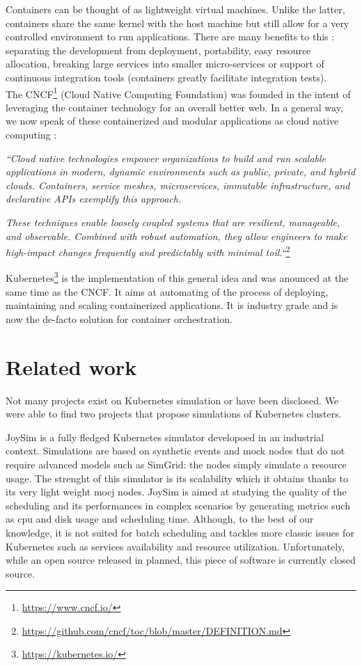 Containers can be thought of as lightweight virtual machines. Unlike the
latter, containers share the same kernel with the host machine but still allow
for a very controlled environment to run applications. There are many
benefits to this : separating the development from deployment, portability,
easy resource allocation, breaking large services into smaller micro-services
or support of continuous integration tools (containers greatly facilitate
integration tests).\\

The CNCF\footnote{\url{https://www.cncf.io/}} (Cloud Native Computing
Foundation) was founded in the intent of leveraging the container technology
for an overall better web. In a general way, we now speak of these
containerized and modular applications as cloud native computing :

\textit{``Cloud native technologies empower organizations to build and run
	scalable applications in modern, dynamic environments such as public,
	private, and hybrid clouds. Containers, service meshes, microservices,
	immutable infrastructure, and declarative APIs exemplify this
	approach.}

\textit{These techniques enable loosely coupled systems that
	are resilient, manageable, and observable.  Combined with robust
	automation, they allow engineers to make high-impact changes frequently
	and predictably with minimal toil.``}\footnote{\url{https://github.com/cncf/toc/blob/master/DEFINITION.md}}

Kubernetes\footnote{\url{https://kubernetes.io/}} is the implementation of this
general idea and was anounced at the same time as the CNCF. It aims at
automating of the process of deploying, maintaining and scaling containerized
applications. It is industry grade and is now the de-facto solution for
container orchestration.

\section{Related work}

Not many projects exist on Kubernetes simulation or have been disclosed. We
were able to find two projects that propose simulations of Kubernetes clusters.

JoySim \cite{joysim} is a fully fledged Kubernetes simulator developoed in an
industrial context. Simulations are based on synthetic events and mock nodes
that do not require advanced models such as SimGrid: the nodes simply simulate
a resource usage. The strenght of this simulator is its scalability which it
obtains thanks to its very light weight mocj nodes. JoySim is aimed at studying
the quality of the scheduling and its performances in complex scenarios by
generating metrics such as cpu and disk usage and scheduling time. Although, to
the best of our knowledge, it is not suited for batch scheduling and tackles
more classic issues for Kubernetes such as services availability and resource
utilization.  Unfortunately, while an open source released in planned, this
piece of software is currently closed source.

